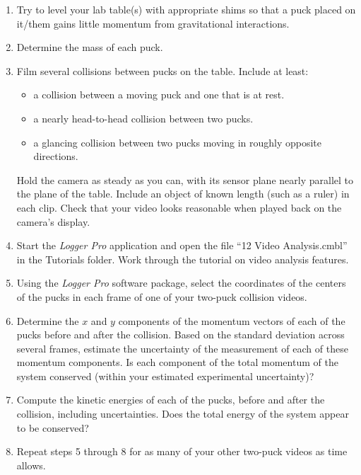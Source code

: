 \documentclass[12pt]{article}
\begin{document}
\bigskip
{}

\begin{enumerate}
\item Try to level your lab table(s) with appropriate shims so that a puck
placed on it/them gains little momentum from gravitational interactions.
\item Determine the mass of each puck.
\item Film several collisions between pucks on the table.  Include at least:
  \begin{itemize}
  \item a collision between a moving puck and one that is at rest.
  \item a nearly head-to-head collision between two pucks.
  \item a glancing collision between two pucks moving in roughly opposite directions.
  \end{itemize}
Hold the camera as steady as you can, with its sensor plane nearly parallel 
to the plane of the table.  Include an object of known length (such as a ruler)
in each clip.  Check that your video looks reasonable when played back on the 
camera's display.  
\item Start the {{\em{Logger Pro}}} application and open the 
file ``12 Video Analysis.cmbl'' in the Tutorials folder.
Work through the tutorial on video analysis features.
\item Using the {\em Logger Pro} software package, select the 
  coordinates of the centers of the pucks in each frame of one of your 
  two-puck collision videos.
\item Determine the $x$ and $y$ components of the momentum vectors of
  each of the pucks before and after the collision.  Based on the standard 
  deviation across several frames, estimate the uncertainty of the measurement 
  of each of these momentum components.  Is each component of the total  
  momentum of the system conserved (within your estimated experimental
  uncertainty)?
\item Compute the kinetic energies of each of the pucks, before and after
  the collision, including uncertainties.  Does the total energy of 
  the system appear to be conserved?
\item Repeat steps 5 through 8 for as many of your other two-puck videos 
  as time allows.
\end{enumerate}
\end{document}
